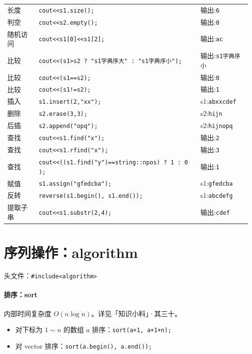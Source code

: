 \documentclass[UTF8]{ctexart}
\begin{document}
\begin{table}[p]
\begin{tabular}{lll}
        长度 & \verb!cout<<s1.size();! & 输出:\verb!6! \\
        判空 & \verb!cout<<s2.empty();! & 输出:\verb!0! \\
        随机访问 & \verb!cout<<s1[0]<<s1[2];! & 输出:\verb!ac! \\
        比较 & \verb!cout<<(s1>s2 ? "s1字典序大" : "s1字典序小");! & 输出:\verb!s1字典序小! \\
        比较 & \verb!cout<<(s1==s2);! & 输出:\verb!0! \\
        比较 & \verb|cout<<(s1!=s2);| & 输出:\verb!1! \\
        插入 & \verb!s1.insert(2,"xx");! & s1:\verb!abxxcdef! \\
        删除 & \verb!s2.erase(3,3);! & s2:\verb!hijn! \\
        后插 & \verb!s2.append("opq");! & s2:\verb!hijnopq! \\
        查找 & \verb!cout<<s1.find("x");! &  输出:\verb!2! \\
        查找 & \verb!cout<<s1.rfind("x");! & 输出:\verb!3! \\
        查找 & \verb!cout<<((s1.find("y")==string::npos) ? 1 : 0 );! & 输出:\verb!1! \\
        赋值 & \verb!s1.assign("gfedcba");! & s1:\verb!gfedcba! \\
        反转 & \verb!reverse(s1.begin(), s1.end());! & s1:\verb!abcdefg!\\
        提取子串 & \verb!cout<<s1.substr(2,4);! & 输出:\verb!cdef! \\
    \bottomrule
    \end{tabular}
\end{table}

\section{序列操作：algorithm}
头文件：\verb!#include<algorithm>!

\paragraph{排序：sort} 内部时间复杂度 $O(n\log n)$。详见「知识小料」·其三十。
\begin{itemize}
    \item 对下标为 $1\sim n$ 的数组 $a$ 排序：\verb!sort(a+1, a+1+n);!
    \item 对 vector 排序：\verb!sort(a.begin(), a.end());!
\end{itemize}
\end{document}
